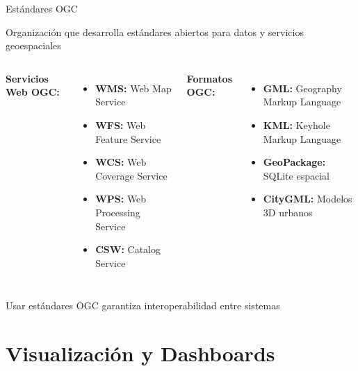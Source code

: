 \documentclass[10pt,aspectratio=169]{beamer}
\newcommand{\conceptbox}[2]{
\begin{tcolorbox}[colframe=usachblue,colback=blue!5,title=#1,fonttitle=\bfseries]
#2
\end{tcolorbox}
}
\newcommand{\alertbox}[1]{
\begin{tcolorbox}[colframe=red!70,colback=red!5]
\centering\faExclamationTriangle\space #1
\end{tcolorbox}
}
\begin{document}
\begin{frame}{Estándares OGC}
    \conceptbox{Open Geospatial Consortium}{
        Organización que desarrolla estándares abiertos para datos y servicios geoespaciales
    }
    
    \begin{columns}[T]
        \textbf{Servicios Web OGC:}
        \begin{itemize}
            \item \textbf{WMS:} Web Map Service
            \item \textbf{WFS:} Web Feature Service
            \item \textbf{WCS:} Web Coverage Service
            \item \textbf{WPS:} Web Processing Service
            \item \textbf{CSW:} Catalog Service
        \end{itemize}
        
        \textbf{Formatos OGC:}
        \begin{itemize}
            \item \textbf{GML:} Geography Markup Language
            \item \textbf{KML:} Keyhole Markup Language
            \item \textbf{GeoPackage:} SQLite espacial
            \item \textbf{CityGML:} Modelos 3D urbanos
        \end{itemize}
    \end{columns}
    
    \vspace{0.3cm}
    \alertbox{Usar estándares OGC garantiza interoperabilidad entre sistemas}
\end{frame}

\section{Visualización y Dashboards}
\end{document}
